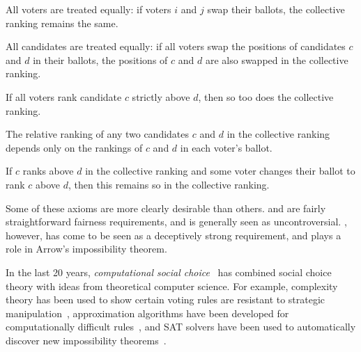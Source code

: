 \begin{axiomlist}

    \begin{axiom}
        All voters are treated equally: if voters $i$ and $j$ swap their
        ballots, the collective ranking remains the same.
    \end{axiom}

    \begin{axiom}
        All candidates are treated equally: if all voters swap the positions of
        candidates $c$ and $d$ in their ballots, the positions of $c$ and $d$
        are also swapped in the collective ranking.
    \end{axiom}

    \begin{axiom}
        If all voters rank candidate $c$ strictly above $d$, then so too does
        the collective ranking.
    \end{axiom}

    \begin{axiom}
        The relative ranking of any two candidates $c$ and $d$ in the
        collective ranking depends only on the rankings of $c$ and $d$ in each
        voter's ballot.
    \end{axiom}

    \begin{axiom}
        If $c$ ranks above $d$ in the collective ranking and some voter changes
        their ballot to rank $c$ above $d$, then this remains so in the
        collective ranking.
    \end{axiom}

\end{axiomlist}

Some of these axioms are more clearly desirable than others.
 and  are fairly straightforward
fairness requirements,\footnotemark{} and  is
generally seen as uncontroversial. , however, has come to be seen
as a deceptively strong requirement, and plays a role in Arrow's impossibility
theorem.


In the last 20 years, \emph{computational social choice}~\cite{moulin_2016} has
combined social choice theory with ideas from theoretical computer science. For
example, complexity theory has been used to show certain voting rules are
resistant to strategic manipulation~\cite{conitzer_manipulation_2016},
approximation algorithms have been developed for computationally difficult
rules~\cite{brandt2016a}, and SAT solvers have been used to automatically
discover new impossibility theorems~\cite{endriss2020analysis}.

